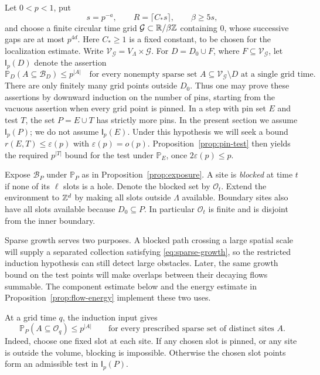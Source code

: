 Let \(0<p<1\), put
\begin{equation}\label{eq:sparse-scales}
 s=p^{-a},\qquad R=\lceil C_*s\rceil,
 \qquad \beta\ge5s,
\end{equation}
and choose a finite circular time grid \(\mathcal G\subset\mathbb R/\beta\mathbb Z\)
containing \(0\), whose successive gaps are at most \(p^{4d}\).
Here \(C_*\ge1\) is a fixed constant, to be chosen for the localization
estimate.  Write \(\mathcal V_{\mathcal G}=V_\Lambda\times\mathcal G\).
For \(D=D_0\cup F\), where \(F\subseteq\mathcal V_{\mathcal G}\), let
\(\mathsf I_p(D)\) denote the assertion
\begin{equation}\label{eq:induction-assertion}
 \mathbb P_D(A\subseteq\mathcal B_D)\le p^{|A|}
 \quad\text{for every nonempty sparse set }A\subseteq
 \mathcal V_{\mathcal G}\setminus D
 \text{ at a single grid time}.
\end{equation}
There are only finitely many grid points outside \(D_0\).
Thus one may prove these assertions by downward induction on the number
of pins, starting from the vacuous assertion when every grid point is
pinned.  In a step with pin set \(E\) and test \(T\), the set
\(P=E\cup T\) has strictly more pins.  In the present section we assume
\(\mathsf I_p(P)\); we do not assume \(\mathsf I_p(E)\).
Under this hypothesis we will seek a bound
\(r(E,T)\le\varepsilon(p)\) with \(\varepsilon(p)=o(p)\).
Proposition~\ref{prop:pin-test} then yields the required
\(p^{|T|}\) bound for the test under \(\mathbb P_E\), once
\(2\varepsilon(p)\le p\).

Expose \(\mathcal B_P\) under \(\mathbb P_P\) as in
Proposition~\ref{prop:exposure}.  A site is \emph{blocked} at time \(t\)
if none of its \(\ell\) slots is a hole.  Denote the blocked set by
\(\mathcal O_t\).  Extend the environment to \(\mathbb Z^d\) by making all
slots outside \(\Lambda\) available.  Boundary sites also have all slots
available because \(D_0\subseteq P\).  In particular \(\mathcal O_t\)
is finite and is disjoint from the inner boundary.

Sparse growth serves two purposes.  A blocked path crossing a large
spatial scale will supply a separated collection satisfying
\eqref{eq:sparse-growth}, so the restricted induction hypothesis can
still detect large obstacles.  Later, the same growth bound on the
test points will make overlaps between their decaying flows summable.
The component estimate below and the energy estimate in
Proposition~\ref{prop:flow-energy} implement these two uses.

At a grid time \(q\), the induction input gives
\begin{equation}\label{eq:grid-blocking}
 \mathbb P_P(A\subseteq\mathcal O_q)\le p^{|A|}
 \qquad\text{for every prescribed sparse set of distinct sites }A.
\end{equation}
Indeed, choose one fixed slot at each site.  If any chosen slot is pinned,
or any site is outside the volume, blocking is impossible.  Otherwise the
chosen slot points form an admissible test in \(\mathsf I_p(P)\).


